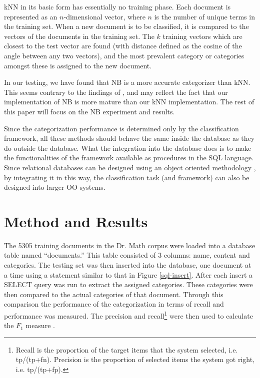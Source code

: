 \documentclass[twocolumn]{article}
\begin{document}
kNN in its basic form has essentially no training phase.  Each
document is represented as an $n$-dimensional vector, where $n$ is the
number of unique terms in the training set.  When a new document is to
be classified, it is compared to the vectors of the documents in the
training set. The $k$ training vectors which are closest to the test
vector are found (with distance defined as the cosine of the angle
between any two vectors), and the most prevalent category or
categories amongst these is assigned to the new document.

In our testing, we have found that NB is a more accurate categorizer
than kNN.  This seems contrary to the findings of \cite{yang:99}, and
may reflect the fact that our implementation of NB is more mature than
our kNN implementation.  The rest of this paper will focus on the NB
experiment and results.

Since the categorization performance is determined only by the classification 
framework, all these methods should behave the same inside the
database as they do outside 
the database. What the integration into the database does is to make the 
functionalities of the framework available as procedures in the SQL language.
Since relational databases can be designed using an object oriented methodology \cite{blaha:88,
rumbaugh:91}, by integrating it in this way, the classification task 
(and framework) can also be designed into larger OO systems.

\section{Method and Results}
\label{results}

The 5305 training documents in the Dr. Math corpus were loaded into a database 
table named ``documents.'' This table consisted of 3 columns: name, content and 
categories. The testing set was then inserted into the database, one document at a time 
using a statement similar to that in Figure \ref{sql-insert}. After each insert a SELECT query was 
run to extract the assigned categories. These categories were then compared to the 
actual categories of that document. Through this comparison the performance of the 
categorization in terms of recall  and performance  was measured. The precision and 
recall\footnote{Recall is the proportion of the target items that the
system selected, i.e. tp/(tp+fn).  Precision is the proportion of
selected items the system got right, i.e. tp/(tp+fp).} were then used
to calculate the $F_1$ measure \cite{calvo:01,sebastiani:02}.
\end{document}
